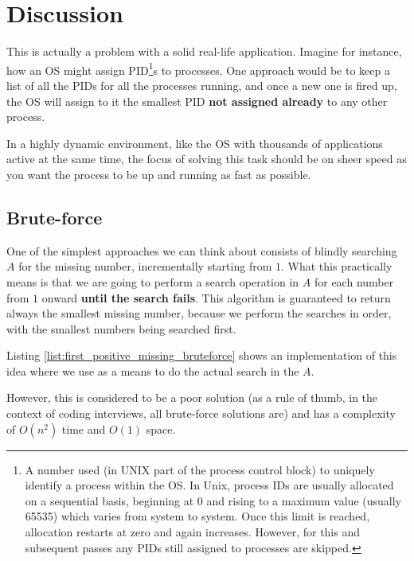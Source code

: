 \section{Discussion}
\label{first_positive_missing:sec:discussion}
This is actually a problem with a solid real-life application.
Imagine for instance, how an OS might assign PID\footnote{A number used (in UNIX part of the process control block) to uniquely identify a process within the OS. In Unix, process IDs are usually allocated on a sequential basis, beginning at 0 and rising to a maximum value (usually 65535) which varies from system to system. Once this limit is reached, allocation restarts at zero and again increases. However, for this and subsequent passes any PIDs still assigned to processes are skipped.}s to processes. One approach would be to keep a list of all the PIDs for all the processes running, and once a new one is fired up, the OS will assign to it the smallest PID \textbf{not assigned already} to any other process. 

In a highly dynamic environment, like the OS with thousands of applications active at the same time, the focus of solving this task should be on sheer speed as you want the process to be up and running as fast as possible. 


\subsection{Brute-force}
One of the simplest approaches we can think about consists of blindly searching $A$ for the missing number, incrementally starting from $1$. 
What this practically means is that we are going to perform a search operation in $A$ for each number from $1$ onward \textbf{until the search fails}.
This algorithm is guaranteed to return always the smallest missing number, because we perform the searches in order, with the smallest numbers being searched first. 

Listing \ref{list:first_positive_missing_bruteforce} shows an implementation of this idea where we use  as a means to do the actual search in the $A$. 
 


However, this is considered to be a poor solution (as a rule of thumb, in the context of coding interviews, all brute-force solutions are) and has a
complexity of $O(n^2)$ time and $O(1)$ space.

